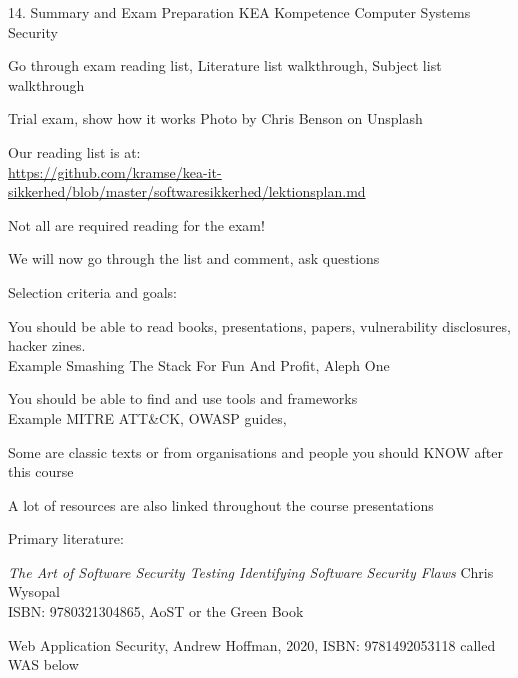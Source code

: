 \documentclass[Screen16to9,17pt]{foils}
\begin{document}
\mytitlepage
{14. Summary and Exam Preparation}
{KEA Kompetence Computer Systems Security}





\begin{list1}
\item Go through exam reading list, Literature list walkthrough, Subject list walkthrough
\item Trial exam, show how it works \hfill {\small Photo by Chris Benson on Unsplash}

\end{list1}




\begin{list1}
\item Our reading list is at:\\
{\small\url{https://github.com/kramse/kea-it-sikkerhed/blob/master/softwaresikkerhed/lektionsplan.md}}
\item Not all are required reading for the exam!
\item We will now go through the list and comment, ask questions
\item Selection criteria and goals:
\begin{list2}
\item You should be able to read books, presentations, papers, vulnerability disclosures, hacker zines. \\
Example Smashing The Stack For Fun And Profit, Aleph One
\item You should be able to find and use tools and frameworks\\
Example MITRE ATT\&CK, OWASP guides,
\end{list2}
\item Some are classic texts or from organisations and people you should KNOW after this course
\item A lot of resources are also linked throughout the course presentations
\end{list1}





Primary literature:
\begin{list2}
\item \emph{The Art of Software Security Testing Identifying Software Security Flaws}
Chris Wysopal\\
ISBN: 9780321304865, AoST or the Green Book
\item Web Application Security, Andrew Hoffman, 2020, ISBN: 9781492053118 called WAS below
\end{list2}
\end{document}

